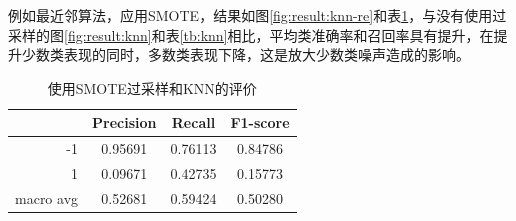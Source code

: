 \documentclass[a4paper]{article}
\begin{document}
例如最近邻算法，应用SMOTE，结果如图\ref{fig:result:knn-re}和表\ref{tb:knn-re}，与没有使用过采样的图\ref{fig:result:knn}和表\ref{tb:knn}相比，平均类准确率和召回率具有提升，在提升少数类表现的同时，多数类表现下降，这是放大少数类噪声造成的影响。

\begin{table}[!h]
    \centering
    \renewcommand{\arraystretch}{1.5}
    \begin{tabular}{|r|c|c|c|}
        \hline
                  & Precision & Recall & F1-score \\ \hline
        -1        &     0.95691     &     0.76113   &    0.84786      \\ \hline
        1         &     0.09671      &     0.42735   &   0.15773       \\ \hline
        macro avg &      0.52681     &     0.59424   &    0.50280      \\ \hline
    \end{tabular}
    \caption{使用SMOTE过采样和KNN的评价}
    \label{tb:knn-re}
\end{table}
\end{document}

